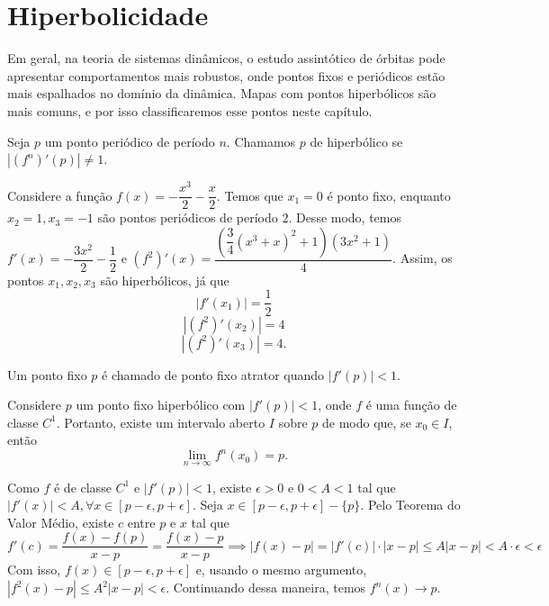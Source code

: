 \documentclass[../IC.tex]{subfiles}
\begin{document}
	\chapter{Hiperbolicidade}
	
	Em geral, na teoria de sistemas dinâmicos, o estudo assintótico de órbitas pode apresentar comportamentos mais robustos, onde pontos fixos e periódicos estão mais espalhados no domínio da dinâmica. Mapas com pontos hiperbólicos são mais comuns, e por isso classificaremos esse pontos neste capítulo.
	
	\begin{definicao}
		Seja $p$ um ponto periódico de período $n$. Chamamos $p$ de hiperbólico se $|(f^n)'(p)| \neq 1$.
	\end{definicao}
	
	\begin{exemplo}
		Considere a função $f(x) = -\dfrac{x^3}{2}-\dfrac{x}{2}$. Temos que $x_1 = 0$ é ponto fixo, enquanto $x_2 = 1, x_3 = -1$ são pontos periódicos de período $2$. Desse modo, temos $f'(x) = -\dfrac{3x^2}{2} - \dfrac{1}{2}$ e $(f^{2})'(x)=\dfrac{\left(\dfrac{3}{4}(x^{3}+x)^{2}+1\right)(3x^{2}+1)}{4}$. Assim, os pontos $x_1,x_2,x_3$ são hiperbólicos, já que
			$$|f'(x_1)| = \dfrac{1}{2}$$
			$$|(f^2)'(x_2)| = 4$$
			$$|(f^2)'(x_3)| = 4.$$
	\end{exemplo}
	
	\begin{definicao}
		Um ponto fixo $p$ é chamado de ponto fixo atrator quando $|f'(p)| < 1$.
	\end{definicao}
	
	\begin{proposicao}
		Considere $p$ um ponto fixo hiperbólico com $|f'(p)| < 1$, onde $f$ é uma função de classe $C^1$. Portanto, existe um intervalo aberto $I$ sobre $p$ de modo que, se $x_0 \in I$, então $$\lim_{n \rightarrow \infty} f^n(x_0) = p.$$
	\end{proposicao}
	
	\begin{prova}
		Como $f$ é de classe $C^1$ e $|f'(p)| < 1$, existe $\epsilon>0$ e $0<A<1$ tal que $|f'(x)|<A, \forall x\in[p-\epsilon, p+\epsilon]$. Seja $x\in[p-\epsilon, p+\epsilon] - \{p\}$. Pelo Teorema do Valor Médio, existe $c$ entre $p$ e $x$ tal que
		$$f'(c) = \frac{f(x)-f(p)}{x-p}=\frac{f(x)-p}{x-p} \implies |f(x)-p|=|f'(c)|\cdot|x-p| \leq A|x-p|<A\cdot\epsilon<\epsilon$$
		Com isso, $f(x) \in [p-\epsilon, p+\epsilon]$ e, usando o mesmo argumento, $|f^2(x)-p|\leq A^2|x-p|<\epsilon$. Continuando dessa maneira, temos $f^n(x)\to p$.
	\end{prova}
	
\end{document}
